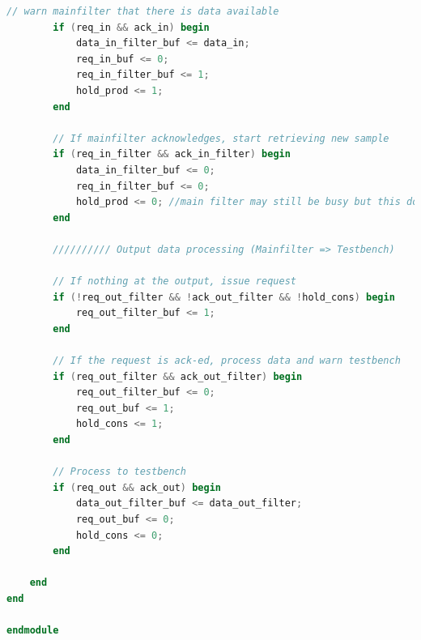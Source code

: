 \documentclass[a4paper,twoside,11pt, fleqn]{article}
\begin{document}
\begin{lstlisting}[language=Verilog]
        // warn mainfilter that there is data available
        if (req_in && ack_in) begin
            data_in_filter_buf <= data_in;
            req_in_buf <= 0;
            req_in_filter_buf <= 1;
            hold_prod <= 1;
        end

        // If mainfilter acknowledges, start retrieving new sample
        if (req_in_filter && ack_in_filter) begin
            data_in_filter_buf <= 0;
            req_in_filter_buf <= 0;
            hold_prod <= 0; //main filter may still be busy but this does not matter, since it will just not acknowledge
        end

        ////////// Output data processing (Mainfilter => Testbench)

        // If nothing at the output, issue request
        if (!req_out_filter && !ack_out_filter && !hold_cons) begin
            req_out_filter_buf <= 1;
        end

        // If the request is ack-ed, process data and warn testbench
        if (req_out_filter && ack_out_filter) begin
            req_out_filter_buf <= 0;
            req_out_buf <= 1;
            hold_cons <= 1;
        end

        // Process to testbench
        if (req_out && ack_out) begin
            data_out_filter_buf <= data_out_filter;
            req_out_buf <= 0;
            hold_cons <= 0;
        end

    end
end

endmodule
\end{lstlisting}

\newpage
\end{document}
